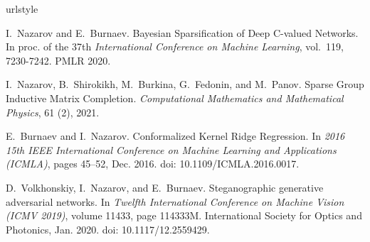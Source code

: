 \documentclass{resume} %
\begin{document}
\bigskip
{
\scriptsize

\renewcommand{\clearpage}{}

\renewcommand{\refname}{Selected Published Research}
\makeatletter
\renewcommand{\bibsection}{%
   \section*{\refname%
            \@mkboth{\MakeUppercase{\refname}}{\MakeUppercase{\refname}}%
   }
}
\makeatother

\begin{thebibliography}{10}
\providecommand{\natexlab}[1]{#1}
\providecommand{\url}[1]{\texttt{#1}}
\expandafter\ifx\csname urlstyle\endcsname\relax
  \providecommand{\doi}[1]{doi: #1}\else
  \providecommand{\doi}{doi: \begingroup \urlstyle{rm}\Url}\fi

I.~Nazarov and E.~Burnaev.
\newblock Bayesian {Sparsification} of {Deep} {C}-valued {Networks}.
\newblock In proc. of the 37th \emph{International {Conference} on {Machine} {Learning}},
  vol.~119, 7230-7242. PMLR 2020.

I.~Nazarov, B.~Shirokikh, M.~Burkina, G.~Fedonin, and M.~Panov.
\newblock Sparse {Group} {Inductive} {Matrix} {Completion}.
\newblock \emph{Computational Mathematics and Mathematical Physics},
  61 (2), 2021.

E.~Burnaev and I.~Nazarov.
\newblock Conformalized {Kernel} {Ridge} {Regression}.
\newblock In \emph{2016 15th {IEEE} {International} {Conference} on {Machine}
  {Learning} and {Applications} ({ICMLA})}, pages 45--52, Dec. 2016.
\newblock \doi{10.1109/ICMLA.2016.0017}.

D.~Volkhonskiy, I.~Nazarov, and E.~Burnaev.
\newblock Steganographic generative adversarial networks.
\newblock In \emph{Twelfth {International} {Conference} on {Machine} {Vision}
  ({ICMV} 2019)}, volume 11433, page 114333M. International Society for Optics
  and Photonics, Jan. 2020.
\newblock \doi{10.1117/12.2559429}.


\end{thebibliography}}
\end{document}
